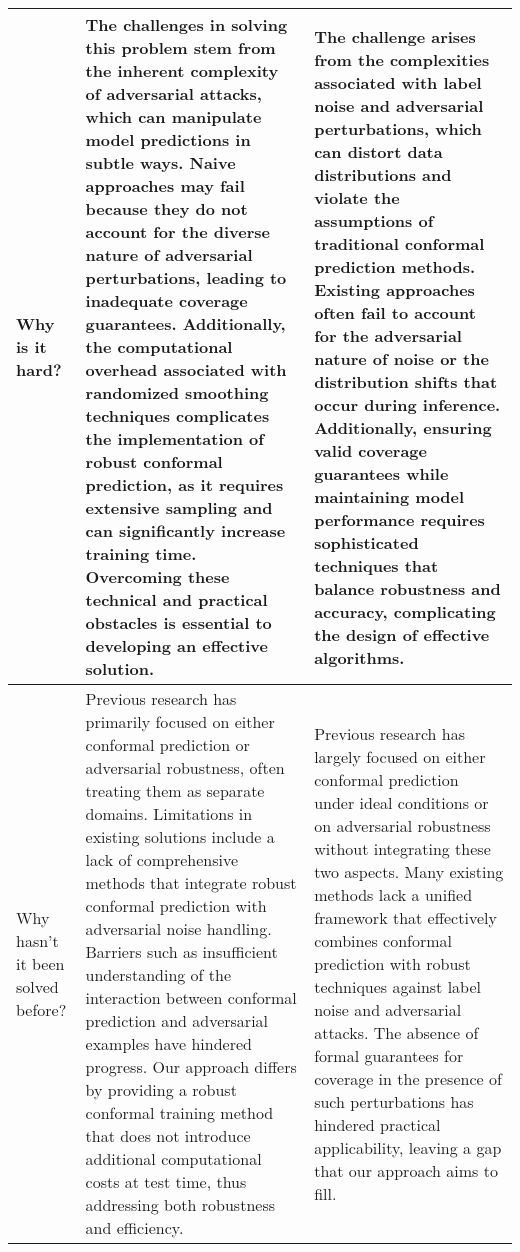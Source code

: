 \begin{table*}[htbp]
\begin{tabular}{p{3cm}p{6cm}p{6cm}}
Why is it hard? & 
The challenges in solving this problem stem from the inherent complexity of adversarial attacks, which can manipulate model predictions in subtle ways. Naive approaches may fail because they do not account for the diverse nature of adversarial perturbations, leading to inadequate coverage guarantees. Additionally, the computational overhead associated with randomized smoothing techniques complicates the implementation of robust conformal prediction, as it requires extensive sampling and can significantly increase training time. Overcoming these technical and practical obstacles is essential to developing an effective solution. &
The challenge arises from the complexities associated with label noise and adversarial perturbations, which can distort data distributions and violate the assumptions of traditional conformal prediction methods. Existing approaches often fail to account for the adversarial nature of noise or the distribution shifts that occur during inference. Additionally, ensuring valid coverage guarantees while maintaining model performance requires sophisticated techniques that balance robustness and accuracy, complicating the design of effective algorithms.
\\ \midrule

Why hasn't it been solved before? & 
Previous research has primarily focused on either conformal prediction or adversarial robustness, often treating them as separate domains. Limitations in existing solutions include a lack of comprehensive methods that integrate robust conformal prediction with adversarial noise handling. Barriers such as insufficient understanding of the interaction between conformal prediction and adversarial examples have hindered progress. Our approach differs by providing a robust conformal training method that does not introduce additional computational costs at test time, thus addressing both robustness and efficiency. &
Previous research has largely focused on either conformal prediction under ideal conditions or on adversarial robustness without integrating these two aspects. Many existing methods lack a unified framework that effectively combines conformal prediction with robust techniques against label noise and adversarial attacks. The absence of formal guarantees for coverage in the presence of such perturbations has hindered practical applicability, leaving a gap that our approach aims to fill.
\\ \midrule


\end{tabular}
\end{table*}
